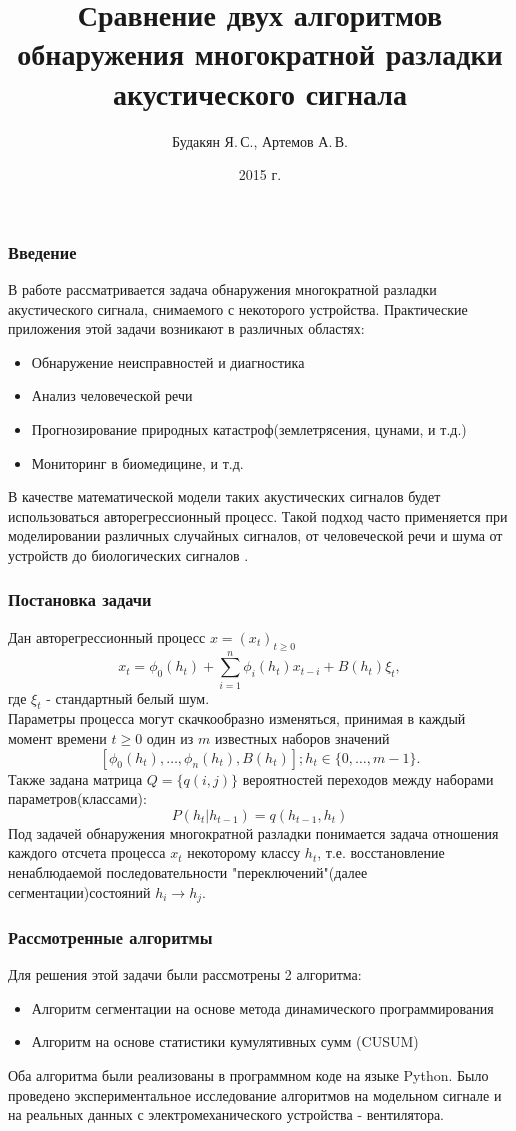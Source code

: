 \documentclass[9pt]{beamer}
\begin{document}
\title{Сравнение двух алгоритмов обнаружения многократной разладки акустического сигнала}
\author{Будакян Я.\,С., Артемов А.\,В.}
\date{2015 г.} 

\maketitle

\begin{frame}\frametitle{Введение}
В работе рассматривается задача обнаружения многократной разладки акустического сигнала, снимаемого с некоторого устройства. Практические приложения этой задачи возникают в различных областях:
\begin{itemize}
\item Обнаружение неисправностей и диагностика
\item Анализ человеческой речи
\item Прогнозирование природных катастроф(землетрясения, цунами, и т.д.)
\item Мониторинг в биомедицине, и т.д.
\end{itemize}

В качестве математической модели таких акустических сигналов будет использоваться авторегрессионный процесс. Такой подход часто применяется при моделировании различных случайных сигналов, от человеческой речи и шума от устройств \cite{TVAR, vehicles} до биологических сигналов \cite{bio}.
\end{frame}

\begin{frame}\frametitle{Постановка задачи} 
Дан авторегрессионный процесс $x = (x_t)_{t\geqslant 0}$
$$x_t = \phi_0(h_t) + \sum_{i=1}^{n} \phi_i(h_t)x_{t-i} + B(h_t)\xi_t,$$
где $\xi_t$ - стандартный белый шум.\\
Параметры процесса могут скачкообразно изменяться, принимая в каждый момент времени $t\geq 0$ один  из $m$ известных наборов значений  $$[\phi_0(h_t),\dots,\phi_n(h_t), B(h_t)]; h_t \in \{0,\dots,m-1\}.$$
Также задана матрица $Q = \{q(i, j)\}$
вероятностей переходов между наборами параметров(классами):
$$P(h_t|h_{t-1}) = q(h_{t-1}, h_t)$$
Под задачей обнаружения многократной разладки понимается задача отношения каждого отсчета процесса $x_t$ некоторому классу $h_t$, т.е. восстановление ненаблюдаемой последовательности "переключений"(далее сегментации)\space состояний $h_i \longrightarrow h_j$.
\end{frame}

\begin{frame}\frametitle{Рассмотренные алгоритмы}
Для решения этой задачи были рассмотрены 2 алгоритма:
\begin{itemize}
\item Алгоритм сегментации на основе метода динамического программирования
\cite{burobin}

\item Алгоритм на основе статистики кумулятивных сумм (CUSUM)
\end{itemize}
Оба алгоритма были реализованы в программном коде на языке Python. Было проведено экспериментальное исследование алгоритмов на модельном сигнале и на реальных данных с электромеханического устройства - вентилятора.
\end{frame}
\end{document}
